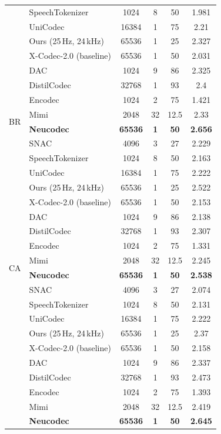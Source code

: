\documentclass[preprint]{article}
\begin{document}
\begin{longtable}{llcccc}
  & SpeechTokenizer & 1024 & 8 & 50 & 1.981 \\
  & UniCodec & 16384 & 1 & 75 & 2.21 \\
  & Ours (25\,Hz, 24\,kHz) & 65536 & 1 & 25 & 2.327 \\
  & X-Codec-2.0 (baseline) & 65536 & 1 & 50 & 2.031 \\
\midrule
\multirow{8}{*}{BR}
  & DAC & 1024 & 9 & 86 & 2.325 \\
  & DistilCodec & 32768 & 1 & 93 & 2.4 \\
  & Encodec & 1024 & 2 & 75 & 1.421 \\
  & Mimi & 2048 & 32 & 12.5 & 2.33 \\
  & \textbf{Neucodec} & \textbf{65536} & \textbf{1} & \textbf{50} & \textbf{2.656} \\
  & SNAC & 4096 & 3 & 27 & 2.229 \\
  & SpeechTokenizer & 1024 & 8 & 50 & 2.163 \\
  & UniCodec & 16384 & 1 & 75 & 2.222 \\
  & Ours (25\,Hz, 24\,kHz) & 65536 & 1 & 25 & 2.522 \\
  & X-Codec-2.0 (baseline) & 65536 & 1 & 50 & 2.153 \\
\midrule
\multirow{8}{*}{CA}
  & DAC & 1024 & 9 & 86 & 2.138 \\
  & DistilCodec & 32768 & 1 & 93 & 2.307 \\
  & Encodec & 1024 & 2 & 75 & 1.331 \\
  & Mimi & 2048 & 32 & 12.5 & 2.245 \\
  & \textbf{Neucodec} & \textbf{65536} & \textbf{1} & \textbf{50} & \textbf{2.538} \\
  & SNAC & 4096 & 3 & 27 & 2.074 \\
  & SpeechTokenizer & 1024 & 8 & 50 & 2.131 \\
  & UniCodec & 16384 & 1 & 75 & 2.222 \\
  & Ours (25\,Hz, 24\,kHz) & 65536 & 1 & 25 & 2.37 \\
  & X-Codec-2.0 (baseline) & 65536 & 1 & 50 & 2.158 \\
\newpage
\multirow{8}{*}{CKB}
  & DAC & 1024 & 9 & 86 & 2.337 \\
  & DistilCodec & 32768 & 1 & 93 & 2.473 \\
  & Encodec & 1024 & 2 & 75 & 1.393 \\
  & Mimi & 2048 & 32 & 12.5 & 2.419 \\
  & \textbf{Neucodec} & \textbf{65536} & \textbf{1} & \textbf{50} & \textbf{2.645} \\

\end{longtable}
\end{document}

